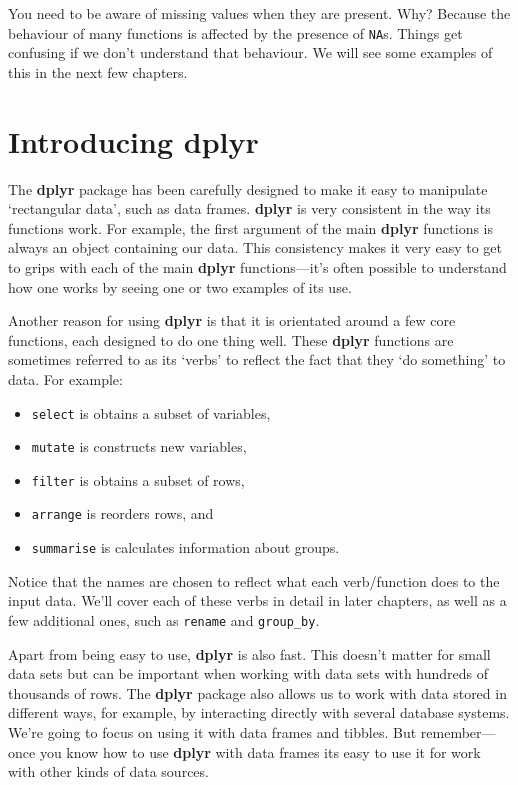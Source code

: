 \documentclass[
]{book}
\providecommand{\tightlist}{%
  \setlength{\itemsep}{0pt}\setlength{\parskip}{0pt}}
\begin{document}
You need to be aware of missing values when they are present. Why? Because the behaviour of many functions is affected by the presence of \texttt{NA}s. Things get confusing if we don't understand that behaviour. We will see some examples of this in the next few chapters.

\hypertarget{why-dplyr}{%
\section{\texorpdfstring{Introducing \textbf{dplyr}}{Introducing dplyr}}\label{why-dplyr}}

The \textbf{dplyr} package has been carefully designed to make it easy to manipulate `rectangular data', such as data frames. \textbf{dplyr} is very consistent in the way its functions work. For example, the first argument of the main \textbf{dplyr} functions is always an object containing our data. This consistency makes it very easy to get to grips with each of the main \textbf{dplyr} functions---it's often possible to understand how one works by seeing one or two examples of its use.

Another reason for using \textbf{dplyr} is that it is orientated around a few core functions, each designed to do one thing well. These \textbf{dplyr} functions are sometimes referred to as its `verbs' to reflect the fact that they `do something' to data. For example:

\begin{itemize}
\tightlist
\item
  \texttt{select} is obtains a subset of variables,
\item
  \texttt{mutate} is constructs new variables,
\item
  \texttt{filter} is obtains a subset of rows,
\item
  \texttt{arrange} is reorders rows, and
\item
  \texttt{summarise} is calculates information about groups.
\end{itemize}

Notice that the names are chosen to reflect what each verb/function does to the input data. We'll cover each of these verbs in detail in later chapters, as well as a few additional ones, such as \texttt{rename} and \texttt{group\_by}.

Apart from being easy to use, \textbf{dplyr} is also fast. This doesn't matter for small data sets but can be important when working with data sets with hundreds of thousands of rows. The \textbf{dplyr} package also allows us to work with data stored in different ways, for example, by interacting directly with several database systems. We're going to focus on using it with data frames and tibbles. But remember---once you know how to use \textbf{dplyr} with data frames its easy to use it for work with other kinds of data sources.
\end{document}
